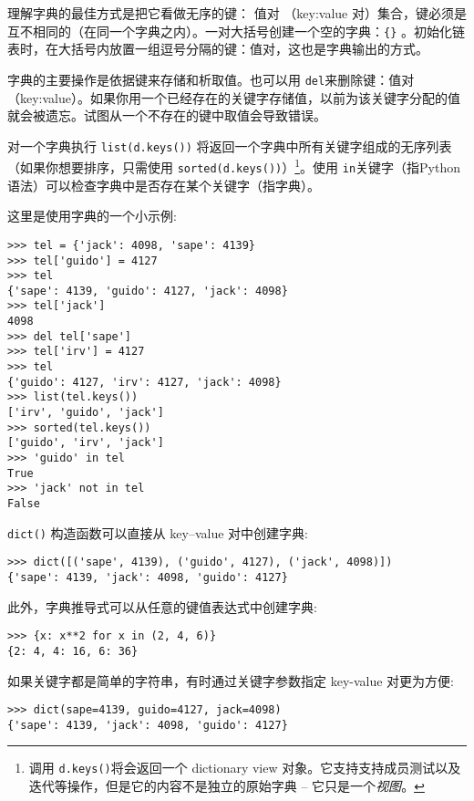 理解字典的最佳方式是把它看做无序的键： 值对 （key:value 对）集合，键必须是互不相同的（在同一个字典之内）。一对大括号创建一个空的字典：\texttt{\{\}} 。初始化链表时，在大括号内放置一组逗号分隔的键：值对，这也是字典输出的方式。

字典的主要操作是依据键来存储和析取值。也可以用 \texttt{del}来删除键：值对（key:value）。如果你用一个已经存在的关键字存储值，以前为该关键字分配的值就会被遗忘。试图从一个不存在的键中取值会导致错误。

对一个字典执行 \texttt{list(d.keys())} 将返回一个字典中所有关键字组成的无序列表（如果你想要排序，只需使用 \texttt{sorted(d.keys())}）\footnote{调用 \texttt{d.keys()}将会返回一个 dictionary view 对象。它支持支持成员测试以及迭代等操作，但是它的内容不是独立的原始字典 – 它只是一个\emph{视图}。}。使用 \texttt{in}关键字（指Python语法）可以检查字典中是否存在某个关键字（指字典）。

这里是使用字典的一个小示例:
\begin{lstlisting}
>>> tel = {'jack': 4098, 'sape': 4139}
>>> tel['guido'] = 4127
>>> tel
{'sape': 4139, 'guido': 4127, 'jack': 4098}
>>> tel['jack']
4098
>>> del tel['sape']
>>> tel['irv'] = 4127
>>> tel
{'guido': 4127, 'irv': 4127, 'jack': 4098}
>>> list(tel.keys())
['irv', 'guido', 'jack']
>>> sorted(tel.keys())
['guido', 'irv', 'jack']
>>> 'guido' in tel
True
>>> 'jack' not in tel
False
\end{lstlisting}
\texttt{dict()} 构造函数可以直接从 key--value 对中创建字典:
\begin{lstlisting}
>>> dict([('sape', 4139), ('guido', 4127), ('jack', 4098)])
{'sape': 4139, 'jack': 4098, 'guido': 4127}
\end{lstlisting}
此外，字典推导式可以从任意的键值表达式中创建字典:
\begin{lstlisting}
>>> {x: x**2 for x in (2, 4, 6)}
{2: 4, 4: 16, 6: 36}
\end{lstlisting}
如果关键字都是简单的字符串，有时通过关键字参数指定 key-value 对更为方便:
\begin{lstlisting}
>>> dict(sape=4139, guido=4127, jack=4098)
{'sape': 4139, 'jack': 4098, 'guido': 4127}
\end{lstlisting}
